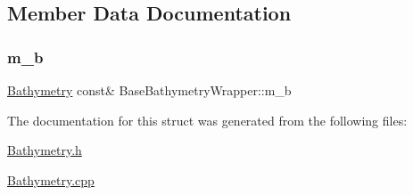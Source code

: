 \subsection{Member Data Documentation}
\mbox{\label{structBaseBathymetryWrapper_a9f4c7c78449986de437fec9f0b556f06}} 
\subsubsection{\texorpdfstring{m\+\_\+b}{m\_b}}
{\footnotesize\ttfamily \hyperlink{structBathymetry}{Bathymetry} const\& Base\+Bathymetry\+Wrapper\+::m\+\_\+b\hspace{0.3cm}{\ttfamily [protected]}}



The documentation for this struct was generated from the following files\+:\begin{DoxyCompactItemize}
\item 
\hyperlink{Bathymetry_8h}{Bathymetry.\+h}\item 
\hyperlink{Bathymetry_8cpp}{Bathymetry.\+cpp}\end{DoxyCompactItemize}
